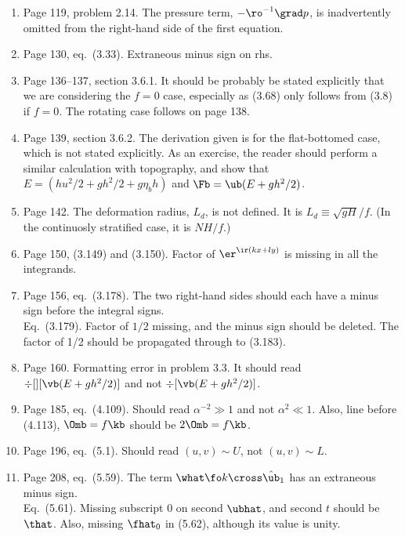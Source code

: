 \documentclass[10pt]{article}
\newcommand{\eq}{eq.\ } \newcommand{\Eq}{Eq.\ }
\begin{document}
\begin{enumerate}
\item Page 119, problem 2.14. The pressure term, $-\ro^{-1} \grad p$, is inadvertently omitted from the right-hand side of the first equation. 

\item Page 130, \eq (3.33). Extraneous minus sign on rhs.

\item Page 136--137, section 3.6.1. It should be probably be stated explicitly that we are considering the $f=0$ case, especially as (3.68) only follows from (3.8) if $f=0$. The rotating case follows on page 138. 

\item Page 139, section 3.6.2. The derivation given is for the flat-bottomed case, which is not stated explicitly. As an exercise, the reader should perform a similar calculation with topography, and show that $E = (h u^2/2 + g h^2/2 + g \eta_b h)$ and $\Fb = \ub( E + g h^2/2)$.  

\item Page 142. The deformation radius, $L_d$, is not defined. It is $L_d \equiv \sqrt{gH}/f$. (In the continuosly stratified case, it is $NH/f$.)

\item Page 150, (3.149) and (3.150). Factor of $\er^{\ir (kx + ly)}$ is missing in all the integrands. 

\item Page 156, \eq (3.178). The two right-hand sides should each have a minus sign before the integral signs. \\
\Eq (3.179). Factor of $1/2$ missing, and the minus sign should be deleted. The factor of 1/2 should be propagated through to (3.183). 

\item Page 160. Formatting error in problem 3.3. It should read $\div[][\vb(E + gh^2/2)]$ and not $\div[\vb(E + gh^2/2)]$. 

\item Page 185, \eq (4.109). Should read $\alpha^{-2} \gg 1$ and not $\alpha^2 \ll 1$. Also, line before (4.113), $\Omb = f \kb$ should be $2\Omb = f \kb$.

\item Page 196, \eq (5.1). Should read $(u, v) \sim U$, not $(u,v) \sim L$.

\item Page 208, \eq (5.59). The term $\what \fo k\cross\hat{\ub}_1$ has an extraneous minus sign. \\
\Eq (5.61). Missing subscript 0 on second $\ubhat$, and second $t$ should be $\that$. Also, missing $\fhat_0$ in (5.62), although its value is unity.


\end{enumerate}
\end{document}

